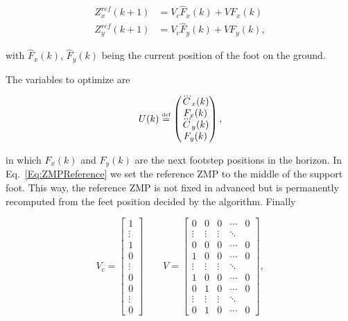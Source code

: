 \begin{eqnarray}
\label{Eq:ZMPReference}
  Z_x^{ref}(k+1) & = V_c \hat{F}_x(k) + V F_x(k) \nonumber \\
  Z_y^{ref}(k+1) & = V_c \hat{F}_y(k) + V F_y(k),
\end{eqnarray}

with $\hat{F}_x(k)$, $\hat{F}_y(k)$ being the current position of the foot on
the ground.

The variables to optimize are

$$
U(k) \stackrel{\mbox{\tiny def}}{=} 
\left(
\begin{matrix}
\dddot{C}_{x}(k) \\
F_x(k) \\
\dddot{C}_{y}(k) \\
F_y(k)
\end{matrix}
\right),
$$

in which $F_x(k)$ and $F_y(k)$ are the next footstep positions in the horizon. In Eq.~\ref{Eq:ZMPReference} we set the reference ZMP to the middle of the support foot. This way, the reference ZMP is not fixed in advanced but is permanently recomputed from the feet position decided by the algorithm. Finally

\begin{equation*}
   V_c = \begin{bmatrix}1 \\ \vdots \\ 1 \\ 0 \\ \vdots \\ 0 \\ 0 \\ \vdots \\ 0  \end{bmatrix} \qquad
   V = \begin{bmatrix} 0 & 0 & 0 & \cdots & 0 \\ \vdots & \vdots
     & \vdots & \ddots\\ 
                                           0 & 0 & 0 & \cdots & 0\\
                           1 & 0 & 0 & \cdots & 0 \\ \vdots & \vdots &
                           \vdots &
                           \ddots \\ 1 & 0 & 0 &\cdots &0\\
                           0 & 1 & 0 & \cdots & 0\\ \vdots & \vdots &
                           \vdots & \ddots \\ 0 & 1 & 0 & \cdots &0\end{bmatrix},
\end{equation*}

